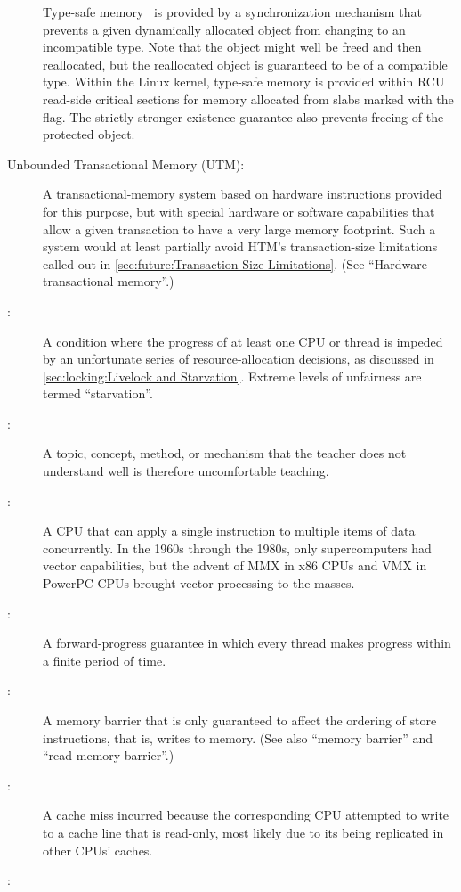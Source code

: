 \begin{description}
	Type-safe memory~\cite{Cheriton96a} is provided by a
	synchronization mechanism that prevents a given dynamically
	allocated object from changing to an incompatible type.
	Note that the object might well be freed and then reallocated, but
	the reallocated object is guaranteed to be of a compatible type.
	Within the Linux kernel, type-safe memory is provided within
	RCU read-side critical sections for memory allocated from slabs
	marked with the  flag.
	The strictly stronger existence guarantee also prevents freeing
	of the protected object.
\item[Unbounded Transactional Memory (UTM):]
	A transactional-memory system based on hardware instructions
	provided for this purpose, but with special hardware or
	software capabilities that allow a given transaction to
	have a very large memory footprint.
	Such a system would at least partially avoid
	HTM's transaction-size limitations called out in
	\cref{sec:future:Transaction-Size Limitations}.
	(See ``Hardware transactional memory''.)
\item[\IXG{Unfairness}:]
	A condition where the progress of at least one CPU or thread
	is impeded by an unfortunate series of resource-allocation
	decisions, as discussed in
	\cref{sec:locking:Livelock and Starvation}.
	Extreme levels of unfairness are termed ``starvation''.
\item[\IXG{Unteachable}:]
	A topic, concept, method, or mechanism that the teacher does
	not understand well is therefore uncomfortable teaching.
\item[\IXGr{Vector CPU}:]
	A CPU that can apply a single instruction to multiple items of
	data concurrently.
	In the 1960s through the 1980s, only supercomputers had vector
	capabilities, but the advent of MMX in x86 CPUs and VMX in
	PowerPC CPUs brought vector processing to the masses.
\item[\IXG{Wait Free}:]
	A forward-progress guarantee in which every thread makes
	progress within a finite period of time.
\item[\IXGh{Write}{Memory Barrier}:]
	A memory barrier that is only guaranteed to affect the ordering
	of store instructions, that is, writes to memory.
	(See also ``memory barrier'' and ``read memory barrier''.)
\item[\IXGalth{Write Miss}{write}{cache miss}:]
	A cache miss incurred because the corresponding CPU attempted
	to write to a cache line that is read-only, most likely due
	to its being replicated in other CPUs' caches.
\item[\IXG{Write Mostly}:]

\end{description}
